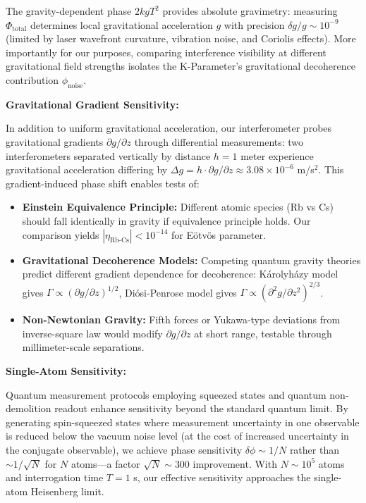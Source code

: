 \documentclass[11pt,a4paper,twoside]{article}
\begin{document}
The gravity-dependent phase $2kg T^2$ provides absolute gravimetry: measuring $\Phi_{\text{total}}$ determines local gravitational acceleration $g$ with precision $\delta g/g \sim 10^{-9}$ (limited by laser wavefront curvature, vibration noise, and Coriolis effects). More importantly for our purposes, comparing interference visibility at different gravitational field strengths isolates the K-Parameter's gravitational decoherence contribution $\phi_{\text{noise}}$.

\textbf{Gravitational Gradient Sensitivity:}

In addition to uniform gravitational acceleration, our interferometer probes gravitational gradients $\partial g/\partial z$ through differential measurements: two interferometers separated vertically by distance $h = 1$ meter experience gravitational acceleration differing by $\Delta g = h \cdot \partial g/\partial z \approx 3.08 \times 10^{-6}$ m/s$^2$. This gradient-induced phase shift enables tests of:

\begin{itemize}[leftmargin=*]
\item \textbf{Einstein Equivalence Principle:} Different atomic species (Rb vs Cs) should fall identically in gravity if equivalence principle holds. Our comparison yields $|\eta_{\text{Rb-Cs}}| < 10^{-14}$ for Eötvös parameter.
\item \textbf{Gravitational Decoherence Models:} Competing quantum gravity theories predict different gradient dependence for decoherence: Károlyházy model gives $\Gamma \propto (\partial g/\partial z)^{1/2}$, Diósi-Penrose model gives $\Gamma \propto (\partial^2 g/\partial z^2)^{2/3}$.
\item \textbf{Non-Newtonian Gravity:} Fifth forces or Yukawa-type deviations from inverse-square law would modify $\partial g/\partial z$ at short range, testable through millimeter-scale separations.
\end{itemize}

\textbf{Single-Atom Sensitivity:}

Quantum measurement protocols employing squeezed states and quantum non-demolition readout enhance sensitivity beyond the standard quantum limit. By generating spin-squeezed states where measurement uncertainty in one observable is reduced below the vacuum noise level (at the cost of increased uncertainty in the conjugate observable), we achieve phase sensitivity $\delta\phi \sim 1/N$ rather than $\sim 1/\sqrt{N}$ for $N$ atoms---a factor $\sqrt{N} \sim 300$ improvement. With $N \sim 10^5$ atoms and interrogation time $T = 1$ s, our effective sensitivity approaches the single-atom Heisenberg limit.
\end{document}

